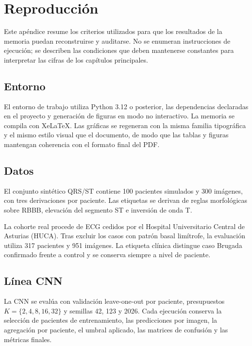 \chapter{Reproducción}
\label{app:reproduccion}

Este apéndice resume los criterios utilizados para que los resultados de la memoria puedan reconstruirse y auditarse. No se enumeran instrucciones de ejecución; se describen las condiciones que deben mantenerse constantes para interpretar las cifras de los capítulos principales.

\section{Entorno}

El entorno de trabajo utiliza Python 3.12 o posterior, las dependencias declaradas en el proyecto y generación de figuras en modo no interactivo. La memoria se compila con XeLaTeX. Las gráficas se regeneran con la misma familia tipográfica y el mismo estilo visual que el documento, de modo que las tablas y figuras mantengan coherencia con el formato final del PDF.

\section{Datos}

El conjunto sintético QRS/ST contiene 100 pacientes simulados y 300 imágenes, con tres derivaciones por paciente. Las etiquetas se derivan de reglas morfológicas sobre RBBB, elevación del segmento ST e inversión de onda T.

La cohorte real procede de ECG cedidos por el Hospital Universitario Central de Asturias (HUCA). Tras excluir los casos con patrón basal limítrofe, la evaluación utiliza 317 pacientes y 951 imágenes. La etiqueta clínica distingue caso Brugada confirmado frente a control y se conserva siempre a nivel de paciente.

\section{Línea CNN}

La CNN se evalúa con validación leave-one-out por paciente, presupuestos \(K=\{2,4,8,16,32\}\) y semillas 42, 123 y 2026. Cada ejecución conserva la selección de pacientes de entrenamiento, las predicciones por imagen, la agregación por paciente, el umbral aplicado, las matrices de confusión y las métricas finales.

